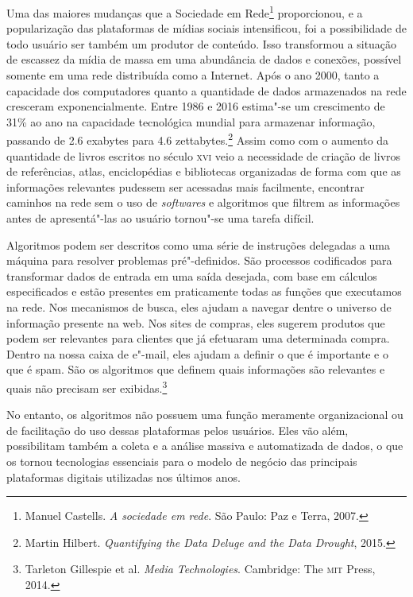 Uma das maiores mudanças que a Sociedade em Rede\footnote{Manuel Castells. \textit{A sociedade em rede}. São Paulo: Paz e Terra, 2007.}
proporcionou, e a popularização das plataformas de mídias sociais
intensificou, foi a possibilidade de todo usuário ser também um produtor
de conteúdo. Isso transformou a situação de escassez da mídia de massa
em uma abundância de dados e conexões, possível somente em uma rede
distribuída como a Internet. Após o ano 2000, tanto a capacidade dos
computadores quanto a quantidade de dados armazenados na rede
cresceram exponencialmente. Entre 1986 e 2016 estima"-se um crescimento de
31\% ao ano na capacidade tecnológica mundial para armazenar informação,
passando de 2.6 exabytes para 4.6 zettabytes.\footnote{Martin Hilbert. \textit{Quantifying the Data Deluge and the Data Drought}, 2015.} Assim como
com o aumento da quantidade de livros escritos no século \textsc{xvi} veio a
necessidade de criação de livros de referências, atlas, enciclopédias e
bibliotecas organizadas de forma com que as informações relevantes
pudessem ser acessadas mais facilmente, encontrar caminhos na rede sem o
uso de \textit{softwares} e algoritmos que filtrem as informações antes de
apresentá"-las ao usuário tornou"-se uma tarefa difícil.


Algoritmos podem ser descritos como uma série de instruções delegadas a
uma máquina para resolver problemas pré"-definidos. São processos
codificados para transformar dados de entrada em uma saída desejada, com
base em cálculos especificados e estão presentes em praticamente todas
as funções que executamos na rede. Nos mecanismos de busca, eles ajudam
a navegar dentre o universo de informação presente na web. Nos sites de
compras, eles sugerem produtos que podem ser relevantes para clientes
que já efetuaram uma determinada compra. Dentro na nossa caixa de
e"-mail, eles ajudam a definir o que é importante e o que é spam. São os
algoritmos que definem quais informações são relevantes e quais não
precisam ser exibidas.\footnote{Tarleton Gillespie et al. \textit{Media
Technologies}. Cambridge: The \textsc{mit} Press, 2014.}

No entanto, os algoritmos não possuem uma função meramente
organizacional ou de facilitação do uso dessas plataformas pelos
usuários. Eles vão além, possibilitam também a coleta e a análise
massiva e automatizada de dados, o que os tornou tecnologias essenciais
para o modelo de negócio das principais plataformas digitais utilizadas
nos últimos anos.

